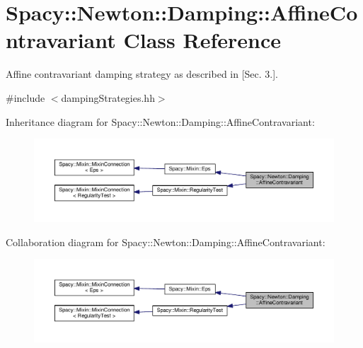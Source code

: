 \hypertarget{classSpacy_1_1Newton_1_1Damping_1_1AffineContravariant}{}\section{Spacy\+:\+:Newton\+:\+:Damping\+:\+:Affine\+Contravariant Class Reference}
\label{classSpacy_1_1Newton_1_1Damping_1_1AffineContravariant}


Affine contravariant damping strategy as described in \cite{Deuflhard2004} \mbox{[}Sec. 3.\mbox{]}.  




{\ttfamily \#include $<$damping\+Strategies.\+hh$>$}



Inheritance diagram for Spacy\+:\+:Newton\+:\+:Damping\+:\+:Affine\+Contravariant\+:
\nopagebreak
\begin{figure}[H]
\begin{center}
\leavevmode
\includegraphics[width=350pt]{classSpacy_1_1Newton_1_1Damping_1_1AffineContravariant__inherit__graph}
\end{center}
\end{figure}


Collaboration diagram for Spacy\+:\+:Newton\+:\+:Damping\+:\+:Affine\+Contravariant\+:
\nopagebreak
\begin{figure}[H]
\begin{center}
\leavevmode
\includegraphics[width=350pt]{classSpacy_1_1Newton_1_1Damping_1_1AffineContravariant__coll__graph}
\end{center}
\end{figure}
